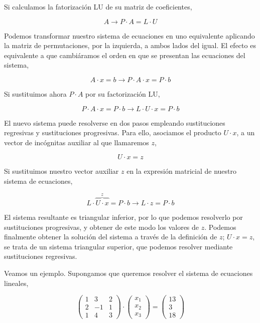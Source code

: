 Si calculamos la fatorización LU de su matriz de  coeficientes,

\begin{equation*}
A \rightarrow P\cdot A = L\cdot U
\end{equation*}

Podemos transformar nuestro sistema de ecuaciones en uno equivalente aplicando la matriz de permutaciones, por la izquierda, a ambos lados del igual. El efecto es equivalente a que cambiáramos el orden en que se presentan las ecuaciones del sistema,

\begin{equation*}
A\cdot x=b\rightarrow P\cdot A \cdot x=P\cdot b
\end{equation*}

Si sustituimos ahora $P\cdot A$ por su factorización LU,

\begin{equation*}
P\cdot A \cdot x=P\cdot b \rightarrow L\cdot U \cdot x= P\cdot b
\end{equation*}

El nuevo sistema puede resolverse en dos pasos empleando sustituciones regresivas y sustituciones progresivas. Para ello, asociamos el producto $U\cdot x$, a un vector de incógnitas auxiliar al que llamaremos $z$,

\begin{equation*}
U\cdot x=z
\end{equation*}

Si sustituimos nuestro vector auxiliar $z$ en la expresión matricial de nuestro sistema de ecuaciones,

\begin{equation*}
L\cdot \overbrace{U\cdot x}^z=P\cdot b \rightarrow L\cdot z=P\cdot b
\end{equation*}

El sistema resultante es triangular inferior, por lo que podemos resolverlo por sustituciones progresivas, y obtener de este modo los valores de $z$. Podemos finalmente obtener la solución del sistema a través de la definición de $z$; $U\cdot x =z$, se trata de un sistema triangular superior, que podemos resolver mediante sustituciones regresivas.

Veamos un ejemplo. Supongamos que queremos resolver el sistema de ecuaciones lineales,

\begin{equation*}
\begin{pmatrix}
1& 3& 2\\
2& -1& 1\\
1& 4& 3
\end{pmatrix}\cdot \begin{pmatrix}
x_1\\
x_2\\
x_3
\end{pmatrix}=\begin{pmatrix}
13\\
3\\
18
\end{pmatrix}
\end{equation*}

